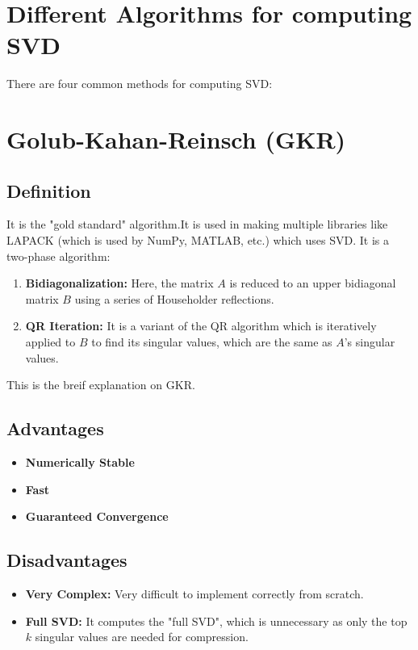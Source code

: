\documentclass[12pt,a4paper]{article}
\begin{document}
\newpage
\section*{Different Algorithms for computing SVD}
There are four common methods for computing SVD:

\section{Golub-Kahan-Reinsch (GKR)}

\subsection*{Definition}
It is the "gold standard" algorithm.It is used in making multiple libraries like LAPACK (which is used by NumPy, MATLAB, etc.) which uses SVD. It is a two-phase algorithm:
\begin{enumerate}
    \item \textbf{Bidiagonalization:} Here, the matrix $A$ is reduced to an upper bidiagonal matrix $B$ using a series of Householder reflections.
    \item \textbf{QR Iteration:} It is a variant of the QR algorithm which is iteratively applied to $B$ to find its singular values, which are the same as $A$'s singular values.
\end{enumerate}
This is the breif explanation on GKR.

\subsection*{Advantages}
\begin{itemize}
    \item \textbf{Numerically Stable}
    \item \textbf{Fast}
    \item \textbf{Guaranteed Convergence}
\end{itemize}

\subsection*{Disadvantages}
\begin{itemize}
    \item \textbf{Very Complex:} Very difficult to implement correctly from scratch.
    \item \textbf{Full SVD:} It computes the "full SVD", which is unnecessary as only the top $k$ singular values are needed for compression.
\end{itemize}
\end{document}
